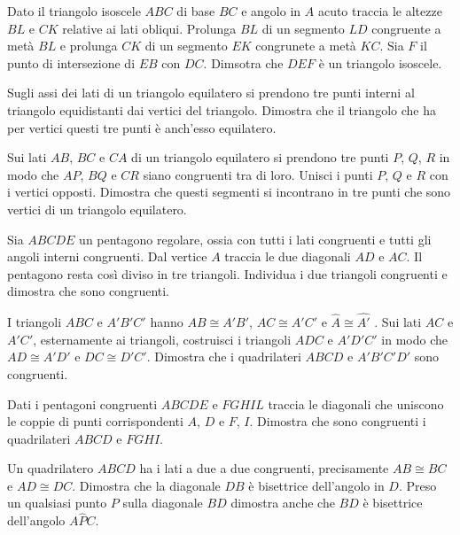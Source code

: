 \begin{multicols}{2}
\begin{esercizio}
\label{ese:2.92}
Dato il triangolo isoscele $ABC$ di base $BC$ e angolo in $A$ acuto 
traccia le altezze $BL$ e $CK$ relative ai lati obliqui. Prolunga 
$BL$ di un segmento $LD$ congruente a metà $BL$ e prolunga $CK$ di un 
segmento $EK$ congrunete a metà $KC$. Sia $F$ il punto di 
intersezione di $EB$ con $DC$. Dimsotra che $DEF$ è un triangolo 
isoscele.
\end{esercizio}

\begin{esercizio}
\label{ese:2.93}
Sugli assi dei lati di un triangolo equilatero si prendono tre punti 
interni al triangolo equidistanti dai vertici del triangolo. Dimostra 
che il triangolo che ha per vertici questi tre punti è anch'esso 
equilatero.
\end{esercizio}

\begin{esercizio}
\label{ese:2.94}
Sui lati $AB$, $BC$ e $CA$ di un triangolo equilatero si prendono tre 
punti $P$, $Q$, $R$ in modo che $AP$, $BQ$ e $CR$ siano congruenti 
tra di loro. Unisci i punti $P$, $Q$ e $R$ con i vertici opposti. 
Dimostra che questi segmenti si incontrano in tre punti che sono 
vertici di un triangolo equilatero.
\end{esercizio}

\begin{esercizio}
\label{ese:2.95}
Sia $ABCDE$ un pentagono regolare, ossia con tutti i lati congruenti 
e tutti gli angoli interni congruenti. Dal vertice $A$ traccia le due 
diagonali $AD$ e $AC$. Il pentagono resta così diviso in tre 
triangoli. Individua i due triangoli congruenti e dimostra che sono 
congruenti.
\end{esercizio}

\begin{esercizio}
\label{ese:2.96}
I triangoli $ABC$ e $A'B'C'$ hanno $AB\cong A'B'$, $AC\cong A'C'$ e 
$\widehat{A}\cong\widehat{A'}$ . Sui lati $AC$ e $A'C'$, esternamente 
ai triangoli, costruisci i triangoli $ADC$ e $A'D'C'$ in modo che 
$AD\cong A'D'$ e $DC\cong D'C'$. Dimostra che i quadrilateri $ABCD$ e 
$A'B'C'D'$ sono congruenti.
\end{esercizio}

\begin{esercizio}
\label{ese:2.97}
Dati i pentagoni congruenti $ABCDE$ e $FGHIL$ traccia le diagonali 
che uniscono le coppie di punti corrispondenti $A$, $D$ e $F$, $I$. 
Dimostra che sono congruenti i quadrilateri $ABCD$ e $FGHI$.
\end{esercizio}

\begin{esercizio}
\label{ese:2.98}
Un quadrilatero $ABCD$ ha i lati a due a due congruenti, precisamente 
$AB\cong BC$ e $AD\cong DC$. Dimostra che la diagonale $DB$ è 
bisettrice dell'angolo in $D$. Preso un qualsiasi punto $P$ sulla 
diagonale $BD$ dimostra anche che $BD$ è bisettrice dell'angolo 
$A\widehat{P}C$.
\end{esercizio}

\end{multicols}

